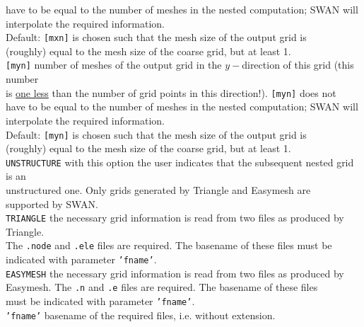 \documentclass[12pt]{book}
\begin{document}
\begin{tabbing}
                     have to be equal to the number of meshes in the nested computation; SWAN will\\
                     interpolate the required information.\\
                     Default: {\tt [mxn]} is chosen such that the mesh size of the output grid is\\
                     (roughly) equal to the mesh size of the coarse grid, but at least 1.\-\\
{\tt [myn]}       \> number of meshes of the output grid in the $y-$direction of this grid (this number\+\\
                     is \underline{one less} than the number of grid points in this direction!). {\tt [myn]} does not\\
                     have to be equal to the number of meshes in the nested computation; SWAN will\\
                     interpolate the required information.\\
                     Default: {\tt [myn]} is chosen such that the mesh size of the output grid is\\
                     (roughly) equal to the mesh size of the coarse grid, but at least 1.\-\\
{\tt UNSTRUCTURE} \> with this option the user indicates that the subsequent nested grid is an\+\\
                     unstructured one. Only grids generated by Triangle and Easymesh are\\
                     supported by SWAN.\-\\
{\tt TRIANGLE}    \> the necessary grid information is read from two files as produced by Triangle.\+\\
                     The {\tt .node} and {\tt .ele} files are required. The basename of these files must be\\
                     indicated with parameter {\tt 'fname'}.\-\\
{\tt EASYMESH}    \> the necessary grid information is read from two files as produced by\+\\
                     Easymesh. The {\tt .n} and {\tt .e} files are required. The basename of these files\\
                     must be indicated with parameter {\tt 'fname'}.\-\\
{\tt 'fname'}     \> basename of the required files, i.e. without extension.\\
\end{tabbing}
\end{document}
